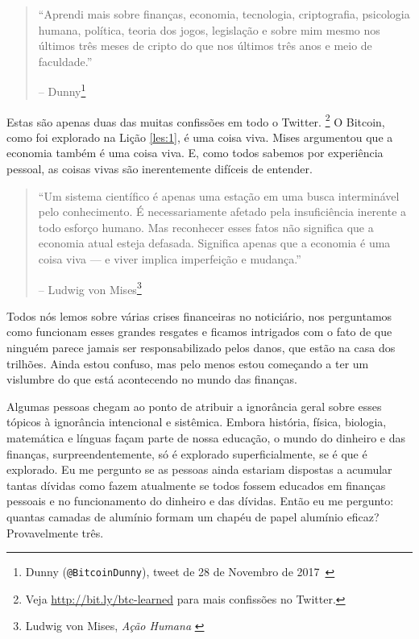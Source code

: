 \begin{quotation}\begin{samepage}
\enquote{Aprendi mais sobre finanças, economia, tecnologia, criptografia, psicologia humana, política, teoria dos jogos, legislação e sobre mim mesmo nos últimos três meses de cripto do que nos últimos três anos e meio de faculdade.}
\begin{flushright} -- Dunny\footnote{Dunny (\texttt{@BitcoinDunny}), tweet de 28 de Novembro de 2017~\cite{bitcoindunny-tweet}}
\end{flushright}\end{samepage}\end{quotation}

Estas são apenas duas das muitas confissões em todo o Twitter. \footnote{Veja \url{http://bit.ly/btc-learned} para mais confissões no Twitter.} O Bitcoin, como foi explorado na Lição \ref{les:1}, é uma coisa viva. Mises argumentou que a economia também é uma coisa viva. E, como todos sabemos por experiência pessoal, as coisas vivas são inerentemente difíceis de entender.

\begin{quotation}\begin{samepage}
\enquote{Um sistema científico é apenas uma estação em uma busca interminável pelo conhecimento. É necessariamente afetado pela insuficiência inerente a todo esforço humano. Mas reconhecer esses fatos não significa que a economia atual esteja defasada. Significa apenas que a economia é uma coisa viva --- e viver implica imperfeição e mudança.}
\begin{flushright} -- Ludwig von Mises\footnote{Ludwig von Mises, \textit{Ação Humana}
\cite{human-action}}
\end{flushright}\end{samepage}\end{quotation}

Todos nós lemos sobre várias crises financeiras no noticiário, nos perguntamos como funcionam esses grandes resgates e ficamos intrigados com o fato de que ninguém parece jamais ser responsabilizado pelos danos, que estão na casa dos trilhões. Ainda estou confuso, mas pelo menos estou começando a ter um vislumbre do que está acontecendo no mundo das finanças.

Algumas pessoas chegam ao ponto de atribuir a ignorância geral sobre esses tópicos à ignorância intencional e sistêmica. Embora história, física, biologia, matemática e línguas façam parte de nossa educação, o mundo do dinheiro e das finanças, surpreendentemente, só é explorado superficialmente, se é que é explorado. Eu me pergunto se as pessoas ainda estariam dispostas a acumular tantas dívidas como fazem atualmente se todos fossem educados em finanças pessoais e no funcionamento do dinheiro e das dívidas. Então eu me pergunto: quantas camadas de alumínio formam um chapéu de papel alumínio eficaz? Provavelmente três.

